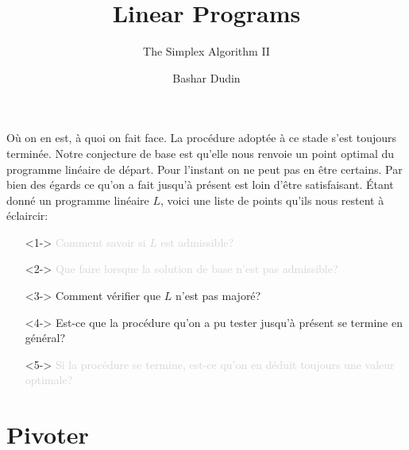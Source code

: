 \documentclass[aspectratio = 169]{beamer}
\author[BD]{Bashar Dudin}
\institute[]{EPITA}
\title{Linear Programs} %
\subtitle{The Simplex Algorithm II}
\begin{document}
\begin{frame}[plain]
\titlepage %
\end{frame}

\begin{frame}{Où on en est, à quoi on fait face.}
  La procédure adoptée à ce stade s'est toujours terminée. Notre
  conjecture de base est qu'elle nous renvoie un point optimal du
  programme linéaire de départ. Pour l'instant on ne peut pas en être
  certains. Par bien des égards ce qu'on a fait jusqu'à présent est
  loin d'être satisfaisant. Étant donné un programme linéaire $L$,
  voici une liste de points qu'ils nous restent à éclaircir:
    \begin{itemize}
    \item[\textcolor<6>{lightgray}{\textbullet}]<1->
      \textcolor<6>{lightgray}{Comment savoir si $L$ est admissible?}
    \item[\textcolor<6>{lightgray}{\textbullet}]<2->
      \textcolor<6>{lightgray}{Que faire lorsque la solution de base
        n'est pas admissible?}
        \item[\textbullet]<3->
          Comment vérifier que $L$ n'est pas majoré?
        \item[\textbullet]<4-> Est-ce que la procédure qu'on a pu
          tester jusqu'à présent se termine en général?
        \item[\textcolor<6>{lightgray}{\textbullet}]<5->
          \textcolor<6>{lightgray}{Si la procédure se termine, est-ce
            qu'on en déduit toujours une valeur optimale?}
    \end{itemize}
\end{frame}

\section{Pivoter}
\end{document}
